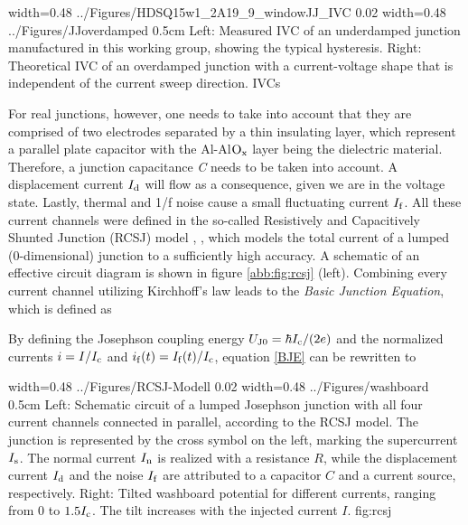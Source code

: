 {width=0.48\textwidth}
{../Figures/HDSQ15w1_2A19_9_windowJJ_IVC}
{0.02\textwidth} %
{width=0.48\textwidth}
{../Figures/JJoverdamped}
{0.5cm} %
{Left: Measured IVC of an underdamped junction manufactured in this working group, showing the typical hysteresis. Right: Theoretical IVC of an overdamped junction with a current-voltage shape that is independent of the current sweep direction.}
{IVCs}

For real junctions, however, one needs to take into account that they are comprised of two electrodes separated by a thin insulating layer, which represent a parallel plate capacitor with the Al-Al$\rm O_x$ layer being the dielectric material. Therefore, a junction capacitance \textit{C} needs to be taken into account. A displacement current $I_{\rm d}$ will flow as a consequence, given we are in the voltage state. Lastly, thermal and 1/f noise cause a small fluctuating current $I_{\rm f}$. All these current channels were defined in the so-called Resistively and Capacitively Shunted Junction (RCSJ) model \cite{Cumber1968}, \cite{Stewart1968}, which models the total current of a lumped (0-dimensional) junction to a sufficiently high accuracy. A schematic of an effective circuit diagram is shown in figure \ref{abb:fig:rcsj} (left). Combining every current channel utilizing Kirchhoff's law leads to the \textit{Basic Junction Equation}, which is defined as \cite{Gross2016}


By defining the Josephson coupling energy $U_{\rm J0}=\hbar I_{\rm c}/(2e)$ and the normalized currents $i=I/I_{\rm c}$ and $i_{\rm f}(t)=I_{\rm f}(t)/I_{\rm c}$, equation \ref{BJE} can be rewritten to 


{width=0.48\textwidth}
{../Figures/RCSJ-Modell}
{0.02\textwidth} %
{width=0.48\textwidth}
{../Figures/washboard}
{0.5cm} %
{Left: Schematic circuit of a lumped Josephson junction with all four current channels connected in parallel, according to the RCSJ model. The junction is represented by the cross symbol on the left, marking the supercurrent $I_{\rm s}$. The normal current $I_{\rm n}$ is realized with a resistance $R$, while the displacement current $I_{\rm d}$ and the noise $I_{\rm f}$ are attributed to a capacitor $C$ and a current source, respectively. Right: Tilted washboard potential for different currents, ranging from 0 to $1.5I_{\rm c}$. The tilt increases with the injected current $I$.}
{fig:rcsj}

